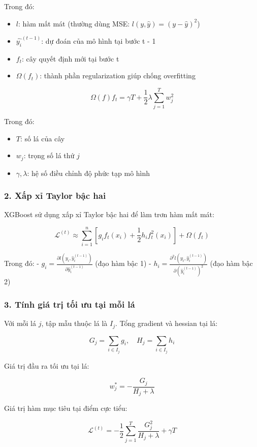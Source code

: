 Trong đó:
\begin{itemize}
    \item \( l \): hàm mất mát (thường dùng MSE: \( l(y, \hat{y}) = (y - \hat{y})^2 \))
    \item \(\hat{y_i}^{(t-1)}\): dự đoán của mô hình tại bước t - 1
    \item \(f_t\): cây quyết định mới tại bước t
    \item \( \Omega(f_t) \): thành phần regularization giúp chống overfitting
\end{itemize}

\[\Omega(f)f_t  = \gamma T + \frac{1}{2} \lambda \sum_{j=1}^{T} w_j^2 \]

Trong đó:
\begin{itemize}
    \item \(T\): số lá của cây
    \item \(w_j\): trọng số lá thứ \(j\)
    \item \(\gamma, \lambda\): hệ số điều chỉnh độ phức tạp mô hình
\end{itemize}
\subsubsection*{2. Xấp xỉ Taylor bậc hai}

XGBoost sử dụng xấp xỉ Taylor bậc hai để làm trơn hàm mất mát:

\[
\mathcal{L}^{(t)} \approx \sum_{i=1}^{n} \left[ g_i f_t(x_i) + \frac{1}{2} h_i f_t^2(x_i) \right] + \Omega(f_t)
\]

Trong đó:
- \( g_i = \frac{\partial l(y_i, \hat{y}_i^{(t-1)})}{\partial \hat{y}_i^{(t-1)}} \) (đạo hàm bậc 1)
- \( h_i = \frac{\partial^2 l(y_i, \hat{y}_i^{(t-1)})}{\partial (\hat{y}_i^{(t-1)})^2} \) (đạo hàm bậc 2)

\subsubsection*{3. Tính giá trị tối ưu tại mỗi lá}

Với mỗi lá \( j \), tập mẫu thuộc lá là \( I_j \). Tổng gradient và hessian tại lá:

\[
G_j = \sum_{i \in I_j} g_i, \quad H_j = \sum_{i \in I_j} h_i
\]

Giá trị đầu ra tối ưu tại lá:

\[
w_j^* = -\frac{G_j}{H_j + \lambda}
\]

Giá trị hàm mục tiêu tại điểm cực tiểu:

\[
\mathcal{L}^{(t)} = -\frac{1}{2} \sum_{j=1}^{T} \frac{G_j^2}{H_j + \lambda} + \gamma T
\]

